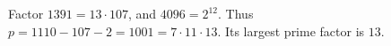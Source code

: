 Factor $1391=13\cdot107$, and $4096=2^{12}$. Thus $p=1110-107-2=1001=7\cdot11\cdot13$. Its largest prime factor is $\boxed{13}$.
